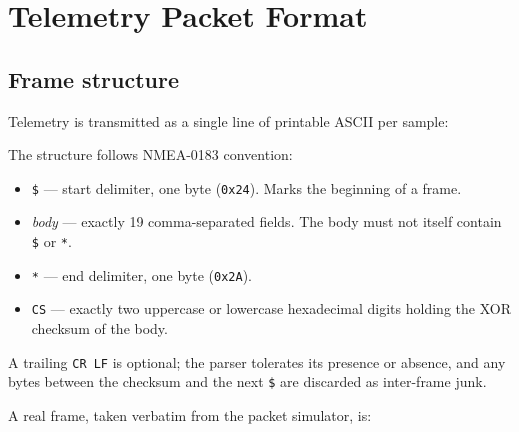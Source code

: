 \documentclass[11pt,a4paper]{article}
\newcommand{\code}[1]{\texttt{#1}}
\begin{document}
\section{Telemetry Packet Format}
\label{sec:packet}

\subsection{Frame structure}

Telemetry is transmitted as a single line of printable ASCII per sample:

\begin{center}
\end{center}

The structure follows NMEA-0183 convention:

\begin{itemize}
  \item \code{\$} --- start delimiter, one byte (\code{0x24}). Marks the
        beginning of a frame.
  \item \emph{body} --- exactly 19 comma-separated fields. The body must not
        itself contain \code{\$} or \code{*}.
  \item \code{*} --- end delimiter, one byte (\code{0x2A}).
  \item \code{CS} --- exactly two uppercase or lowercase hexadecimal digits
        holding the XOR checksum of the body.
\end{itemize}

A trailing \code{CR\,LF} is optional; the parser tolerates its presence or
absence, and any bytes between the checksum and the next \code{\$} are
discarded as inter-frame junk.

A real frame, taken verbatim from the packet simulator, is:

\begin{center}
\end{center}
\end{document}
